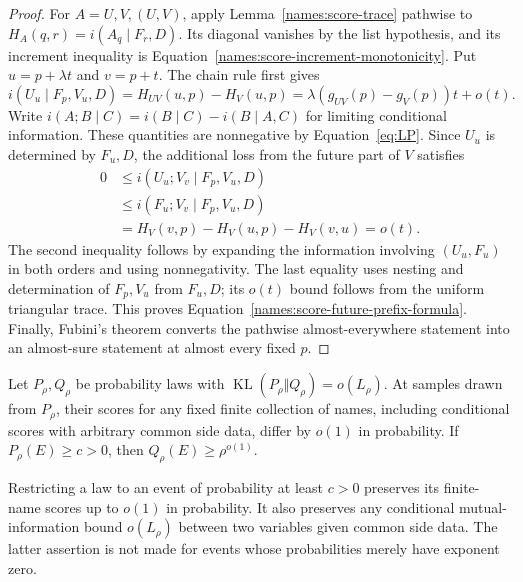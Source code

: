 \begin{proof}
For $A=U,V,(U,V)$, apply Lemma~\ref{names:score-trace} pathwise to
$H_A(q,r)=i(A_q\mid F_r,D)$.  Its diagonal vanishes by the list
hypothesis, and its increment inequality is
Equation~\eqref{names:score-increment-monotonicity}.  Put
$u=p+\lambda t$ and $v=p+t$.  The chain rule first gives
\[
 i(U_u\mid F_p,V_u,D)
   =H_{UV}(u,p)-H_V(u,p)
   =\lambda(g_{UV}(p)-g_V(p))t+o(t).
\]
Write $i(A;B\mid C)=i(B\mid C)-i(B\mid A,C)$ for limiting conditional
information.  These quantities are nonnegative by
Equation~\eqref{eq:LP}.  Since $U_u$ is determined by $F_u,D$, the
additional loss from the future part of $V$ satisfies
\begin{align*}
 0&\le i(U_u;V_v\mid F_p,V_u,D)\\
  &\le i(F_u;V_v\mid F_p,V_u,D)\\
  &=H_V(v,p)-H_V(u,p)-H_V(v,u)=o(t).
\end{align*}
The second inequality follows by expanding the information involving
$(U_u,F_u)$ in both orders and using nonnegativity.  The last equality
uses nesting and determination of $F_p,V_u$ from $F_u,D$; its $o(t)$
bound follows from the uniform triangular trace.  This proves
Equation~\eqref{names:score-future-prefix-formula}.  Finally, Fubini's
theorem converts the pathwise almost-everywhere statement into an
almost-sure statement at almost every fixed $p$.
\end{proof}

\begin{lemma}
\label{names:score-law-change}
Let $P_\rho,Q_\rho$ be probability laws with
$\operatorname{KL}(P_\rho\Vert Q_\rho)=o(L_\rho)$.  At samples drawn
from $P_\rho$, their scores for any fixed finite collection of names,
including conditional scores with arbitrary common side data, differ
by $o(1)$ in probability.  If $P_\rho(E)\ge c>0$, then
$Q_\rho(E)\ge\rho^{o(1)}$.

Restricting a law to an event of probability at least $c>0$ preserves
its finite-name scores up to $o(1)$ in probability.  It also preserves
any conditional mutual-information bound $o(L_\rho)$ between two
variables given common side data.  The latter assertion is not made
for events whose probabilities merely have exponent zero.
\end{lemma}

